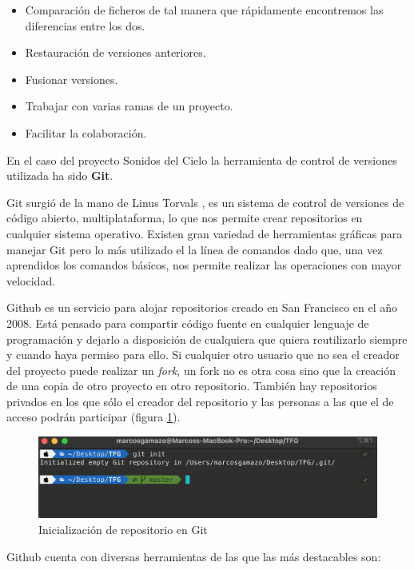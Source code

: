 \begin{itemize}
    \item Comparación de ficheros de tal manera que rápidamente encontremos las diferencias entre los dos. 
    \item Restauración de versiones anteriores.
    \item Fusionar versiones.
    \item Trabajar con varias ramas de un proyecto.
    \item Facilitar la colaboración.
\end{itemize}


En el caso del proyecto Sonidos del Cielo la herramienta de control de versiones utilizada ha sido \textbf{Git}. 

Git surgió de la mano de Linus Torvals \cite{torvalds2005git}, es un sistema de control de versiones de código abierto, multiplataforma, lo que nos permite crear repositorios en cualquier sistema operativo. Existen gran variedad de herramientas gráficas para manejar Git pero lo más utilizado el la línea de comandos dado que, una vez aprendidos los comandos básicos, nos permite realizar las operaciones con mayor velocidad. 

Github es un servicio para alojar repositorios creado en San Francisco en el año 2008. Está pensado para compartir código fuente en cualquier lenguaje de programación y dejarlo a disposición de cualquiera que quiera reutilizarlo siempre y cuando haya permiso para ello. Si cualquier otro usuario que no sea el creador del proyecto puede realizar un \textit{fork}, un fork no es otra cosa sino que la creación de una copia de otro proyecto en otro repositorio.
También hay repositorios privados en los que sólo el creador del repositorio y las personas a las que el de acceso podrán participar (figura \ref{fig:git_init}).

\begin{figure}[h]
    \centering
    \includegraphics[width=\textwidth]{include/capturas/gitInit.png}
    \caption{Inicialización de repositorio en Git}
    \label{fig:git_init}
\end{figure}


Github cuenta con diversas herramientas de las que las más destacables son:

